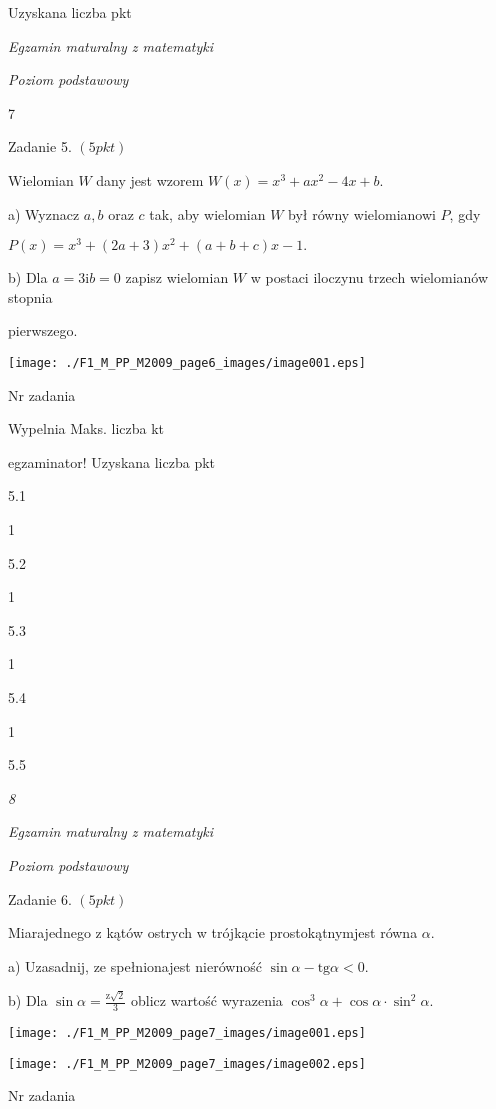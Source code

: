 \documentclass[a4paper,12pt]{article}
\begin{document}
Uzyskana liczba pkt





{\it Egzamin maturalny z matematyki}

{\it Poziom podstawowy}

7

Zadanie 5. $(5pkt)$

Wielomian $W$ dany jest wzorem $W(x)=x^{3}+ax^{2}-4x+b.$

a) Wyznacz $a, b$ oraz $c$ tak, aby wielomian $W$ był równy wielomianowi $P$, gdy

$P(x)=x^{3}+(2a+3)x^{2}+(a+b+c)x-1.$

b) Dla $a=3 \mathrm{i} b=0$ zapisz wielomian $W$ w postaci iloczynu trzech wielomianów stopnia

pierwszego.
\begin{center}
\texttt{[image: ./F1\_M\_PP\_M2009\_page6\_images/image001.eps]}
\end{center}
Nr zadania

Wypelnia Maks. liczba kt

egzaminator! Uzyskana liczba pkt

5.1

1

5.2

1

5.3

1

5.4

1

5.5





{\it 8}

{\it Egzamin maturalny z matematyki}

{\it Poziom podstawowy}

Zadanie 6. $(5pkt)$

Miarajednego z kątów ostrych w trójkącie prostokątnymjest równa $\alpha.$

a) Uzasadnij, ze spełnionajest nierówność $\sin\alpha-\mathrm{t}\mathrm{g}\alpha<0.$

b) Dla $\displaystyle \sin\alpha=\frac{\mathrm{z}\sqrt{2}}{3}$ oblicz wartość wyrazenia $\cos^{3}\alpha+\cos\alpha\cdot\sin^{2}\alpha.$
\begin{center}
\texttt{[image: ./F1\_M\_PP\_M2009\_page7\_images/image001.eps]}

\texttt{[image: ./F1\_M\_PP\_M2009\_page7\_images/image002.eps]}
\end{center}
Nr zadania
\end{document}
